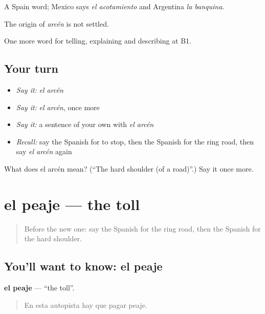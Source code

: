 A Spain word; Mexico says \emph{el acotamiento} and Argentina \emph{la banquina}.

\begin{cousinweb}
The origin of \emph{arcén} is not settled.
\end{cousinweb}

\begin{grammarlens}[title={What you've built}]
One more word for telling, explaining and describing at B1.
\end{grammarlens}

\subsection*{Your turn}
\begin{itemize}
\raggedright
  \item \emph{Say it:} \emph{el arcén}
  \item \emph{Say it:} \emph{el arcén}, once more
  \item \emph{Say it:} a sentence of your own with \emph{el arcén}
  \item \emph{Recall:} say the Spanish for to stop, then the Spanish for the ring road, then say \emph{el arcén} again
\end{itemize}

\begin{tcolorbox}[breakable,colback=teal!4,colframe=teal!35!black,title={Before you move on}]
What does el arcén mean? (\textquotedblleft{}The hard shoulder (of a road)\textquotedblright{}.) Say it once more.
\end{tcolorbox}
\section[el peaje]{el peaje — the toll}

\label{lesson:ES-C642-peaje}



\begin{quote}
Before the new one: say the Spanish for the ring road, then the Spanish for the hard shoulder.
\end{quote}

\subsection*{You'll want to know: el peaje}
\textbf{el peaje} — \textquotedblleft{}the toll\textquotedblright{}.

\begin{quote}
En esta autopista hay que pagar peaje.
\end{quote}

